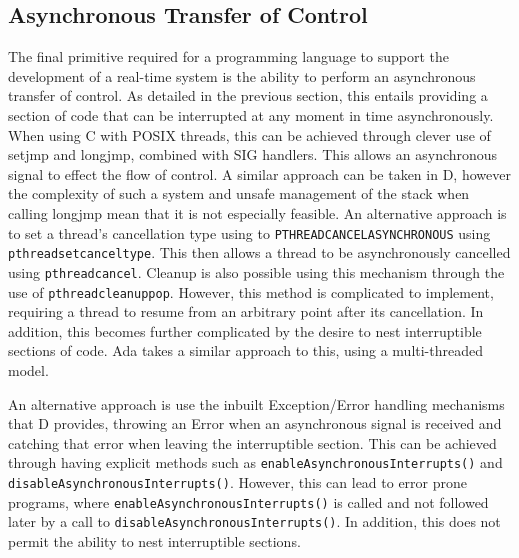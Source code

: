 \subsection{Asynchronous Transfer of Control}
The final primitive required for a programming language to support the development 
of a real-time system is the ability to perform an asynchronous transfer of 
control. As detailed in the previous section, this entails providing a 
section of code that can be interrupted at any moment in time asynchronously. 
When using C with POSIX threads, this can be achieved through clever use of 
setjmp and longjmp, combined with SIG handlers. This allows an asynchronous 
signal to effect the flow of control. A similar approach can be taken in D, 
however the complexity of such a system and unsafe management of the stack when 
calling longjmp 
\cite{unwinding-stack} mean that it is not especially feasible. 
An alternative approach is to set a thread's cancellation type using to 
\texttt{PTHREAD\textunderscore{}CANCEL\textunderscore{}ASYNCHRONOUS} using 
\texttt{pthread\textunderscore{}setcanceltype}. This then allows a thread to 
be asynchronously cancelled using \texttt{pthread\textunderscore{}cancel}. Cleanup 
is also possible using this mechanism through the use of 
\texttt{pthread\textunderscore{}cleanup\textunderscore{}pop}. However, 
this method is complicated to implement, requiring a thread to resume from an 
arbitrary point after its cancellation. In addition, this becomes further 
complicated by the desire to nest interruptible sections of code. 
Ada takes a similar approach to this, using a multi-threaded model. 
\par\bigskip\noindent
An alternative approach is use the inbuilt Exception/Error handling mechanisms 
that D provides, throwing an Error when an asynchronous signal is received and 
catching that error when leaving the interruptible section. This can be 
achieved through having explicit methods such as \texttt{enableAsynchronousInterrupts()}
and \texttt{disableAsynchronousInterrupts()}. However, this can lead to error 
prone programs, where \texttt{enableAsynchronousInterrupts()} is called and not 
followed later by a call to \texttt{disableAsynchronousInterrupts()}. 
In addition, this does not permit the ability to nest interruptible sections. 
